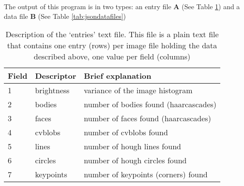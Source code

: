 The output of this program is in two types: an entry file \textbf{A} (See Table \ref{tab:textdatafiles}) and a data file \textbf{B} (See Table \ref{tab:jsondatafiles})


\begin{table}
\begin{tabular}{ l | l | l }

Field & Descriptor  & Brief explanation

\tabularnewline
\hline

1 & brightness   & variance of the image histogram

\tabularnewline
\hline

2 & bodies       & number of bodies found (haarcascades)

\tabularnewline
\hline

3 & faces        & number of faces found (haarcascades)

\tabularnewline
\hline

4 & cvblobs      & number of cvblobs found

\tabularnewline
\hline

5 & lines        & number of hough lines found

\tabularnewline
\hline

6 & circles      & number of hough circles found

\tabularnewline
\hline

7 & keypoints    & number of keypoints (corners) found


\end{tabular}
\caption{Description of the `entries' text file. This file is a plain text file that contains one entry (rows) per image file holding the data described above, one value per field (columns)}
\label{tab:textdatafiles}
\end{table}


